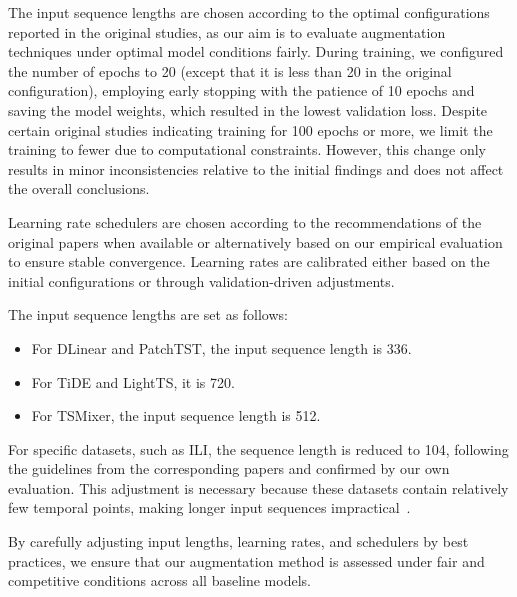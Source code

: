 The input sequence lengths are chosen according to the optimal configurations reported in the original studies, as our aim is to evaluate augmentation techniques under optimal model conditions fairly. During training, we configured the number of epochs to 20 (except that it is less than 20 in the original configuration), employing early stopping with the patience of 10 epochs and saving the model weights, which resulted in the lowest validation loss. Despite certain original studies indicating training for 100 epochs or more, we limit the training to fewer due to computational constraints. However, this change only results in minor inconsistencies relative to the initial findings and does not affect the overall conclusions.

Learning rate schedulers are chosen according to the recommendations of the original papers when available or alternatively based on our empirical evaluation to ensure stable convergence. Learning rates are calibrated either based on the initial configurations or through validation-driven adjustments.

The input sequence lengths are set as follows:


\begin{itemize}
    \item For DLinear and PatchTST, the input sequence length is 336.
    \item For TiDE and LightTS, it is 720.
    \item For TSMixer, the input sequence length is 512.
\end{itemize}

For specific datasets, such as ILI, the sequence length is reduced to 104, following the guidelines from the corresponding papers and confirmed by our own evaluation. This adjustment is necessary because these datasets contain relatively few temporal points, making longer input sequences impractical~\cite{zeng2022transformerseffectivetimeseries, nie2023timeseriesworth64}.

By carefully adjusting input lengths, learning rates, and schedulers by best practices, we ensure that our augmentation method is assessed under fair and competitive conditions across all baseline models.




